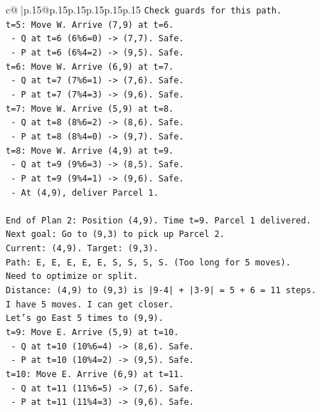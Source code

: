 \documentclass{article}
\begin{document}
{\begin{supertabular}{c@{$\;$}|p{.15\linewidth}@{}p{.15\linewidth}p{.15\linewidth}p{.15\linewidth}p{.15\linewidth}p{.15\linewidth}}
{{{\texttt{Check guards for this path.} \\
\texttt{t=5: Move W. Arrive (7,9) at t=6.} \\
\texttt{  {-} Q at t=6 (6\%6=0) {-}> (7,7). Safe.} \\
\texttt{  {-} P at t=6 (6\%4=2) {-}> (9,5). Safe.} \\
\texttt{t=6: Move W. Arrive (6,9) at t=7.} \\
\texttt{  {-} Q at t=7 (7\%6=1) {-}> (7,6). Safe.} \\
\texttt{  {-} P at t=7 (7\%4=3) {-}> (9,6). Safe.} \\
\texttt{t=7: Move W. Arrive (5,9) at t=8.} \\
\texttt{  {-} Q at t=8 (8\%6=2) {-}> (8,6). Safe.} \\
\texttt{  {-} P at t=8 (8\%4=0) {-}> (9,7). Safe.} \\
\texttt{t=8: Move W. Arrive (4,9) at t=9.} \\
\texttt{  {-} Q at t=9 (9\%6=3) {-}> (8,5). Safe.} \\
\texttt{  {-} P at t=9 (9\%4=1) {-}> (9,6). Safe.} \\
\texttt{  {-} At (4,9), deliver Parcel 1.} \\
\\ 
\texttt{End of Plan 2: Position (4,9). Time t=9. Parcel 1 delivered.} \\
\texttt{Next goal: Go to (9,3) to pick up Parcel 2.} \\
\texttt{Current: (4,9). Target: (9,3).} \\
\texttt{Path: E, E, E, E, E, S, S, S, S. (Too long for 5 moves).} \\
\texttt{Need to optimize or split.} \\
\texttt{Distance: (4,9) to (9,3) is |9{-}4| + |3{-}9| = 5 + 6 = 11 steps.} \\
\texttt{I have 5 moves. I can get closer.} \\
\texttt{Let's go East 5 times to (9,9).} \\
\texttt{t=9: Move E. Arrive (5,9) at t=10.} \\
\texttt{  {-} Q at t=10 (10\%6=4) {-}> (8,6). Safe.} \\
\texttt{  {-} P at t=10 (10\%4=2) {-}> (9,5). Safe.} \\
\texttt{t=10: Move E. Arrive (6,9) at t=11.} \\
\texttt{  {-} Q at t=11 (11\%6=5) {-}> (7,6). Safe.} \\
\texttt{  {-} P at t=11 (11\%4=3) {-}> (9,6). Safe.} \\
}}}
\end{supertabular}}
\end{document}
